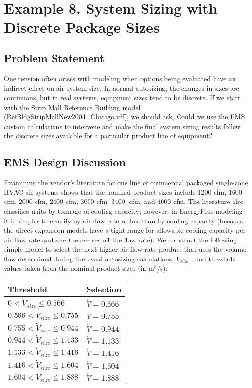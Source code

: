 \section{Example 8. System Sizing with Discrete Package Sizes}\label{example-8.-system-sizing-with-discrete-package-sizes}

\subsection{Problem Statement}\label{problem-statement-010}

One tension often arises with modeling when options being evaluated have an indirect effect on air system size. In normal autosizing, the changes in sizes are continuous, but in real systems, equipment sizes tend to be discrete. If we start with the Strip Mall Reference Building model (RefBldgStripMallNew2004\_Chicago.idf), we should ask, Could we use the EMS custom calculations to intervene and make the final system sizing results follow the discrete sizes available for a particular product line of equipment?

\subsection{EMS Design Discussion}\label{ems-design-discussion-010}

Examining the vendor's literature for one line of commercial packaged single-zone HVAC air systems shows that the nominal product sizes include 1200 cfm, 1600 cfm, 2000 cfm, 2400 cfm, 3000 cfm, 3400, cfm, and 4000 cfm. The literature also classifies units by tonnage of cooling capacity; however, in EnergyPlus modeling it is simpler to classify by air flow rate rather than by cooling capacity (because the direct expansion models have a tight range for allowable cooling capacity per air flow rate and size themselves off the flow rate). We construct the following simple model to select the next higher air flow rate product that uses the volume flow determined during the usual autosizing calculations, \(\dot{V}_{size}\) , and threshold values taken from the nominal product sizes (in m\(^{3}\)/s):

\begin{longtable}[c]{p{4.03in}p{1.96in}}
\toprule 
Threshold & Selection \tabularnewline \midrule
\endhead
$0  <  \dot{V}_{size} \leq 0.566$ & $\dot{V} = 0.566$ \tabularnewline
$0.566  <  \dot{V}_{size} \leq 0.755$ & $\dot{V} = 0.755$ \tabularnewline
$0.755  <  \dot{V}_{size} \leq 0.944$ & $\dot{V} = 0.944$ \tabularnewline
$0.944  <  \dot{V}_{size} \leq 1.133$ & $\dot{V} = 1.133$ \tabularnewline
$1.133  <  \dot{V}_{size} \leq 1.416$ & $\dot{V} = 1.416$ \tabularnewline
$1.416  <  \dot{V}_{size} \leq 1.604$ & $\dot{V} = 1.604$ \tabularnewline
$1.604  <  \dot{V}_{size} \leq 1.888$ & $\dot{V} = 1.888$ \tabularnewline
\bottomrule
\end{longtable}


